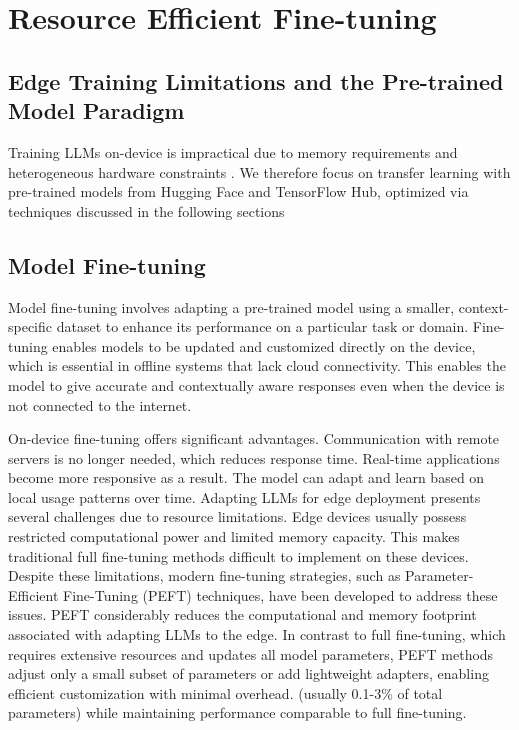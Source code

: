\documentclass[11pt]{IEEEtran}
\begin{document}
\section{Resource Efficient Fine-tuning}

\subsection{Edge Training Limitations and the Pre-trained Model Paradigm}
Training LLMs on-device is impractical due to memory requirements and heterogeneous hardware constraints \cite{b8,b9}. We therefore focus on transfer learning with pre-trained models from Hugging Face and TensorFlow Hub, optimized via techniques discussed in the following sections

\subsection{Model Fine-tuning}
Model fine-tuning involves adapting a pre-trained model using a smaller, context-specific
dataset \cite{b59} to enhance its performance on a particular task or domain. Fine-tuning enables models to be updated and customized directly on the device, which is essential in offline systems that lack cloud connectivity. This enables the model to give accurate and contextually aware responses even when the device is not connected to the internet.

On-device fine-tuning offers significant advantages. Communication with remote servers is no longer needed, which reduces response time. Real-time applications become more responsive as a result. The model can adapt and learn based on local usage patterns over time. Adapting LLMs for edge deployment presents several challenges due to resource limitations. Edge devices usually possess restricted computational power and limited memory capacity. This makes traditional full fine-tuning methods difficult to implement on these devices. Despite these limitations, modern fine-tuning strategies, such as Parameter-Efficient Fine-Tuning (PEFT) techniques, have been developed to address these issues\cite{b11,b60,b61}. PEFT considerably reduces the computational and memory footprint associated with adapting LLMs to the edge. In contrast to full fine-tuning, which requires extensive resources and updates all model parameters, PEFT methods adjust only a small subset of parameters or add lightweight adapters, enabling efficient customization with minimal overhead. (usually 0.1-3\% of total parameters) while maintaining performance comparable to full fine-tuning.
\end{document}
